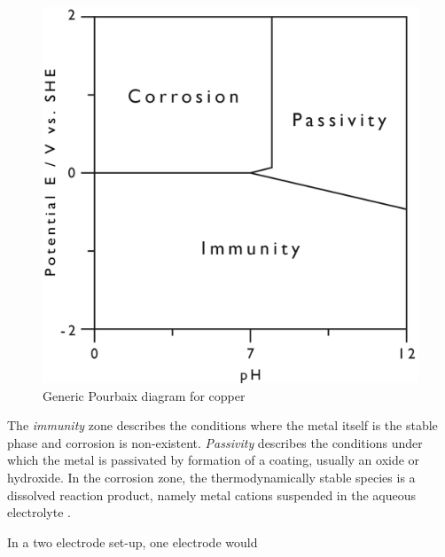 {%
	\begin{figure}
		\centering
		\includegraphics[scale=1]{Figures/pourbaix_generic}
		\caption{Generic Pourbaix diagram for copper}
		\label{fig:pourbaix_generic}
	\end{figure}

The \textit{immunity} zone describes the conditions where the metal itself is the stable phase and corrosion is non-existent. \textit{Passivity} describes the conditions under which the metal is passivated by formation of a coating, usually an oxide or hydroxide. In the corrosion zone, the thermodynamically stable species is a dissolved reaction product, namely metal cations suspended in the aqueous electrolyte \citep{Beverskog1995}.

In a two electrode set-up, one electrode would 

}